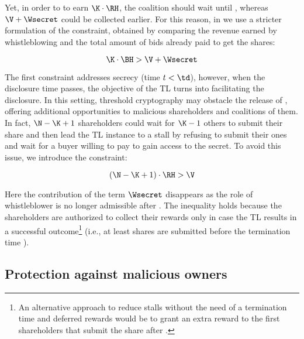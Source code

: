 Yet, in order to to earn $\K \cdot \RH$, the coalition \coalition should wait until \td, whereas $\V + \Wsecret$ could be collected earlier.
For this reason, in \shortname we use a stricter formulation of the constraint, obtained by comparing the revenue earned by whistleblowing and the total amount of bids already paid \coalition to get the shares:

\begin{equation}\label{eqcoscom2}
\K \cdot \BH > \V + \Wsecret
\end{equation}

The first constraint addresses secrecy (time $t < \td$), however, when the disclosure time passes, the objective of the TL turns into facilitating the disclosure.
In this setting, threshold cryptography may obstacle the release of \secret, offering additional opportunities to malicious shareholders and coalitions of them.
In fact, $\N - \K + 1$ shareholders could wait for $\K - 1$ others to submit their share and then lead the TL instance to a stall by refusing to submit their ones and wait for a buyer willing to pay \V to gain access to the secret.
To avoid this issue, we introduce the constraint:  

\begin{equation}\label{eqcoscom4}
(\N - \K + 1) \cdot \RH  > \V
\end{equation}

Here the contribution of the term $\Wsecret$ disappears as the role of whistleblower is no longer admissible after \td. The inequality holds because the shareholders are authorized to collect their rewards \RH only in case the TL results in a successful outcome\footnote{An alternative approach to reduce stalls without the need of a termination time and deferred rewards would be to grant an extra reward \extrareward to the first \K shareholders that submit the share after \td.
}
(i.e., at least \K shares are submitted before the termination time \te).


\subsection{Protection against malicious owners}\label{sect:mal_own}

